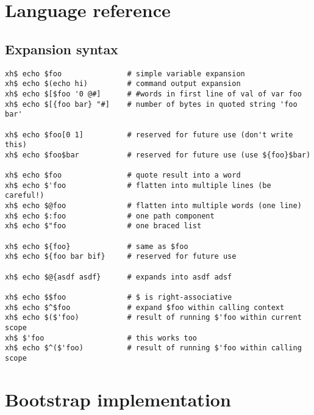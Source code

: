 \documentclass{report}
\begin{document}
\part{Language reference}\label{part:language-reference}
\chapter{Expansion syntax}\label{chp:expansion-syntax}
\begin{verbatim}
xh$ echo $foo               # simple variable expansion
xh$ echo $(echo hi)         # command output expansion
xh$ echo $[$foo '0 @#]      # #words in first line of val of var foo
xh$ echo $[{foo bar} "#]    # number of bytes in quoted string 'foo bar'

xh$ echo $foo[0 1]          # reserved for future use (don't write this)
xh$ echo $foo$bar           # reserved for future use (use ${foo}$bar)

xh$ echo $foo               # quote result into a word
xh$ echo $'foo              # flatten into multiple lines (be careful!)
xh$ echo $@foo              # flatten into multiple words (one line)
xh$ echo $:foo              # one path component
xh$ echo $"foo              # one braced list

xh$ echo ${foo}             # same as $foo
xh$ echo ${foo bar bif}     # reserved for future use

xh$ echo $@{asdf asdf}      # expands into asdf adsf

xh$ echo $$foo              # $ is right-associative
xh$ echo $^$foo             # expand $foo within calling context
xh$ echo $($'foo)           # result of running $'foo within current scope
xh$ $'foo                   # this works too
xh$ echo $^($'foo)          # result of running $'foo within calling scope
\end{verbatim}

\part{Bootstrap implementation}\label{part:bootstrap-implementation}
\end{document}
